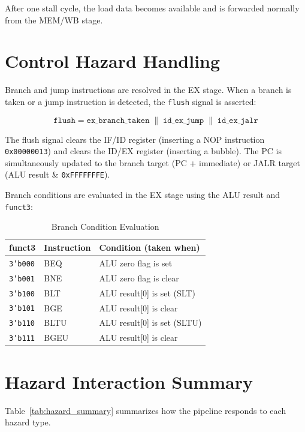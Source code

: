 \documentclass[12pt,a4paper]{report}
\begin{document}
After one stall cycle, the load data becomes available and is forwarded normally from
the MEM/WB stage.

\section{Control Hazard Handling}
Branch and jump instructions are resolved in the EX stage. When a branch is taken or
a jump instruction is detected, the \texttt{flush} signal is asserted:

\[
\texttt{flush} = \texttt{ex\_branch\_taken} \;\|\; \texttt{id\_ex\_jump} \;\|\; \texttt{id\_ex\_jalr}
\]

The flush signal clears the IF/ID register (inserting a NOP instruction
\texttt{0x00000013}) and clears the ID/EX register (inserting a bubble). The PC is
simultaneously updated to the branch target (PC + immediate) or JALR target
(ALU result \& \texttt{0xFFFFFFFE}).

Branch conditions are evaluated in the EX stage using the ALU result and \texttt{funct3}:

\begin{table}[H]
\centering
\caption{Branch Condition Evaluation}
\label{tab:branch}
\begin{tabular}{C{2.0cm} L{3.0cm} L{5.5cm}}
    \toprule
    \textbf{funct3} & \textbf{Instruction} & \textbf{Condition (taken when)} \\
    \midrule
    \texttt{3'b000} & BEQ  & ALU zero flag is set \\
    \texttt{3'b001} & BNE  & ALU zero flag is clear \\
    \texttt{3'b100} & BLT  & ALU result[0] is set (SLT) \\
    \texttt{3'b101} & BGE  & ALU result[0] is clear \\
    \texttt{3'b110} & BLTU & ALU result[0] is set (SLTU) \\
    \texttt{3'b111} & BGEU & ALU result[0] is clear \\
    \bottomrule
\end{tabular}
\end{table}

\section{Hazard Interaction Summary}
Table~\ref{tab:hazard_summary} summarizes how the pipeline responds to each hazard
type.
\end{document}

